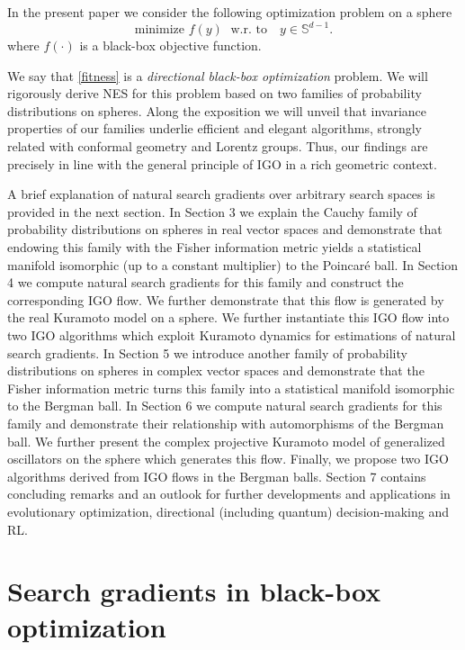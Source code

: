 \documentclass{article}
\theoremstyle{plain}%
\theoremstyle{definition}
\theoremstyle{remark}
\theoremstyle{prop}
\begin{document}
In the present paper we consider the following optimization problem on a sphere
\begin{equation}
\label{fitness}
\mbox{minimize  } f(y) \; \mbox{ w.r. to} \quad y \in {\mathbb S}^{d-1}.
\end{equation}
where $f(\cdot)$ is a black-box objective function.

We say that \eqref{fitness} is a {\it directional black-box optimization} problem. We will rigorously derive NES for this problem based on two families of probability distributions on spheres. Along the exposition we will unveil that invariance properties of our families underlie efficient and elegant algorithms, strongly related with conformal geometry and Lorentz groups. Thus, our findings are precisely in line with the general principle of IGO in a rich geometric context. 

A brief explanation of natural search gradients over arbitrary search spaces is provided in the next section. In Section 3 we explain the Cauchy family of probability distributions on spheres in real vector spaces and demonstrate that endowing this family with the Fisher information metric yields a statistical manifold isomorphic (up to a constant multiplier) to the Poincar\' e ball. In Section 4 we compute natural search gradients for this family and construct the corresponding IGO flow. We further demonstrate that this flow is generated by the real Kuramoto model on a sphere. We further instantiate this IGO flow into two IGO algorithms which exploit Kuramoto dynamics for estimations of natural search gradients. In Section 5 we introduce another family of probability distributions on spheres in complex vector spaces and demonstrate that the Fisher information metric turns this family into a statistical manifold isomorphic to the Bergman ball. In Section 6 we compute natural search gradients for this family and demonstrate their relationship with automorphisms of the Bergman ball. We further present the complex projective Kuramoto model of generalized oscillators on the sphere which generates this flow. Finally, we propose two IGO algorithms derived from IGO flows in the Bergman balls. Section 7 contains concluding remarks and an outlook for further developments and applications in evolutionary optimization, directional (including quantum) decision-making and RL.  




\section{Search gradients in black-box optimization}
\end{document}
